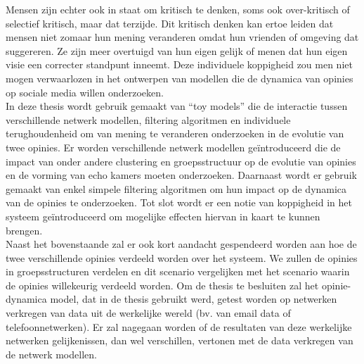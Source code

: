 \documentclass[11 pt , letterpaper , twoside , openright]{book}
\newenvironment{abstract}%
{\cleardoublepage\null \vfill\begin{center}\bfseries \abstractname \end{center}}{\vfill\null}
\begin{document}
\begin{abstract}
\newline
Mensen zijn echter ook in staat om kritisch te denken, soms ook over-kritisch of selectief kritisch, maar dat terzijde. Dit kritisch denken kan ertoe leiden dat mensen niet zomaar hun mening veranderen omdat hun vrienden of omgeving dat suggereren. Ze zijn meer overtuigd van hun eigen gelijk of menen dat hun eigen visie een correcter standpunt inneemt. Deze individuele koppigheid zou men niet mogen verwaarlozen in het ontwerpen van modellen die de dynamica van opinies op sociale media willen onderzoeken.\\
\newline
In deze thesis wordt gebruik gemaakt van ``toy models'' die de interactie tussen verschillende netwerk modellen, filtering algoritmen en individuele terughoudenheid om van mening te veranderen onderzoeken in de evolutie van twee opinies. Er worden verschillende netwerk modellen geïntroduceerd die de impact van onder andere clustering en groepsstructuur op de evolutie van opinies en de vorming van echo kamers moeten onderzoeken. Daarnaast wordt er gebruik gemaakt van enkel simpele filtering algoritmen om hun impact op de dynamica van de opinies te onderzoeken. Tot slot wordt er een notie van koppigheid in het systeem geïntroduceerd om mogelijke effecten hiervan in kaart te kunnen brengen. \\
\newline
Naast het bovenstaande zal er ook kort aandacht gespendeerd worden aan hoe de twee verschillende opinies verdeeld worden over het systeem. We zullen de opinies in groepsstructuren verdelen en dit scenario vergelijken met het scenario waarin de opinies willekeurig verdeeld worden. Om de thesis te besluiten zal het opinie-dynamica model, dat in de thesis gebruikt werd, getest worden op netwerken verkregen van data uit de werkelijke wereld (bv. van email data of telefoonnetwerken). Er zal nagegaan worden of de resultaten van deze werkelijke netwerken gelijkenissen, dan wel verschillen, vertonen met de data verkregen van de netwerk modellen.
\setcounter{abstractpage}{\value{page}}
\end{abstract}

\setcounter{page}{\value{abstractpage}}

\tableofcontents
{}
\listoffigures
{}
\listoftables
{}
\end{document}
